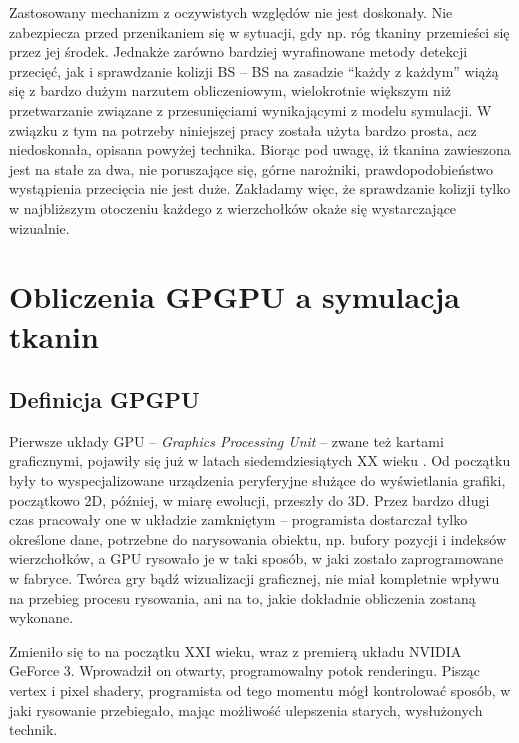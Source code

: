 				Zastosowany mechanizm z oczywistych względów nie jest doskonały. Nie zabezpiecza przed przenikaniem się w sytuacji, gdy np. róg tkaniny przemieści się przez jej środek. Jednakże zarówno bardziej wyrafinowane metody detekcji przecięć, jak i sprawdzanie kolizji BS -- BS na zasadzie ``każdy z każdym'' wiążą się z bardzo dużym narzutem obliczeniowym, wielokrotnie większym niż przetwarzanie związane z przesunięciami wynikającymi z modelu symulacji. W związku z tym na potrzeby niniejszej pracy została użyta bardzo prosta, acz niedoskonała, opisana powyżej technika. Biorąc pod uwagę, iż tkanina zawieszona jest na stałe za dwa, nie poruszające się, górne narożniki, prawdopodobieństwo wystąpienia przecięcia nie jest duże. Zakładamy więc, że sprawdzanie kolizji tylko w najbliższym otoczeniu każdego z wierzchołków okaże się wystarczające wizualnie.
			
	\section{Obliczenia GPGPU a symulacja tkanin}
	\label{t:teoria:gpu}
	
		\subsection{Definicja GPGPU}
		\label{t:teoria:gpu:gpgpu}
		
		Pierwsze układy GPU -- \emph{Graphics Processing Unit} -- zwane też kartami graficznymi, pojawiły się już w latach siedemdziesiątych XX wieku \cite{gpu_wiki}. Od początku były to wyspecjalizowane urządzenia peryferyjne służące do wyświetlania grafiki, początkowo 2D, później, w miarę ewolucji, przeszły do 3D. Przez bardzo długi czas pracowały one w układzie zamkniętym -- programista dostarczał tylko określone dane, potrzebne do narysowania obiektu, np. bufory pozycji i indeksów wierzchołków, a GPU rysowało je w taki sposób, w jaki zostało zaprogramowane w fabryce. Twórca gry bądź wizualizacji graficznej, nie miał kompletnie wpływu na przebieg procesu rysowania, ani na to, jakie dokładnie obliczenia zostaną wykonane. 
		
		Zmieniło się to na początku XXI wieku, wraz z premierą układu NVIDIA GeForce 3. Wprowadził on otwarty, programowalny potok renderingu. Pisząc vertex i pixel shadery, programista od tego momentu mógł kontrolować sposób, w jaki rysowanie przebiegało, mając możliwość ulepszenia starych, wysłużonych technik. 
		
